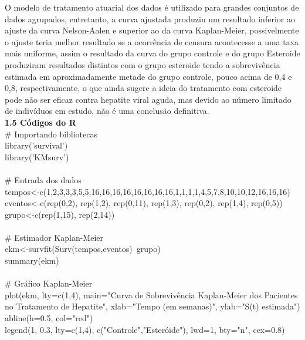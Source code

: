 \documentclass[12pt,a4paper]{article}
\begin{document}
	O modelo de tratamento atuarial dos dados é utilizado para grandes conjuntos de dados agrupados, entretanto, a curva ajustada produziu   um resultado inferior ao ajuste da curva Nelson-Aalen e superior ao da curva Kaplan-Meier, possivelmente o ajuste teria melhor resultado se a ocorrência de censura acontecesse a uma taxa mais uniforme, assim o resultado da curva do grupo controle e do grupo Esteroide produziram resultados distintos com o grupo esteroide tendo a sobrevivência estimada em aproximadamente metade do grupo controle, pouco acima de 0,4 e 0,8, respectivamente, o que ainda sugere a ideia do tratamento com esteroide pode não ser eficaz contra hepatite viral aguda, mas devido ao número limitado de indivíduos em estudo, não é uma conclusão definitiva.
		\vspace{1cm}\\
	\textbf{1.5 Códigos do R}
	\vspace{1cm}\\
	\# Importando bibliotecas\\
	library('survival')\\
	library('KMsurv')\\
	\vspace{0.25cm}\\
	\# Entrada dos dados\\
	tempos<-c(1,2,3,3,3,5,5,16,16,16,16,16,16,16,16,1,1,1,1,4,5,7,8,10,10,12,16,16,16)\\
	eventos<-c(rep(0,2), rep(1,2), rep(0,11), rep(1,3), rep(0,2), rep(1,4), rep(0,5))\\
	grupo<-c(rep(1,15), rep(2,14))\\
	\vspace{0.25cm}\\
	\# Estimador Kaplan-Meier\\
	ekm<-survfit(Surv(tempos,eventos)~grupo)\\
	summary(ekm)\\
	\vspace{0.25cm}\\
	\# Gráfico Kaplan-Meier\\
	plot(ekm, lty=c(1,4), main="Curva de Sobrevivência Kaplan-Meier dos Pacientes no Tratamento de Hepatite", xlab="Tempo (em semanas)", ylab="S(t) estimada")\\
	abline(h=0.5, col="red")\\
	legend(1, 0.3, lty=c(1,4), c("Controle","Esteróide"), lwd=1, bty="n", cex=0.8)\\
	\vspace{0.25cm}\\
\end{document}
